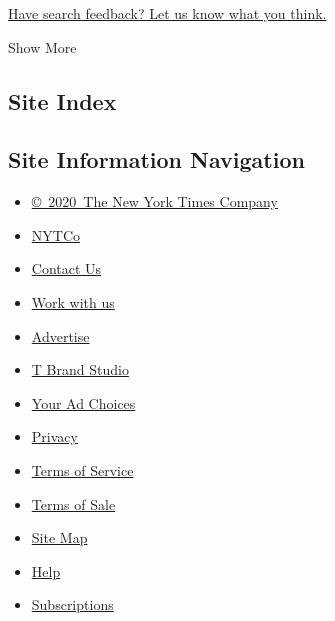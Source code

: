 \href{http://nyt.qualtrics.com/jfe/form/SV_ehZpyzWtbwO9HVj?v=a}{Have
search feedback? Let us know what you think.}

Show More

\hypertarget{site-index}{%
\subsection{Site Index}\label{site-index}}

\hypertarget{site-information-navigation}{%
\subsection{Site Information
Navigation}\label{site-information-navigation}}

\begin{itemize}
\tightlist
\item
  \href{https://help.nytimes3xbfgragh.onion/hc/en-us/articles/115014792127-Copyright-notice}{©~2020~The
  New York Times Company}
\end{itemize}

\begin{itemize}
\tightlist
\item
  \href{https://www.nytco.com/}{NYTCo}
\item
  \href{https://help.nytimes3xbfgragh.onion/hc/en-us/articles/115015385887-Contact-Us}{Contact
  Us}
\item
  \href{https://www.nytco.com/careers/}{Work with us}
\item
  \href{https://nytmediakit.com/}{Advertise}
\item
  \href{http://www.tbrandstudio.com/}{T Brand Studio}
\item
  \href{https://www.nytimes3xbfgragh.onion/privacy/cookie-policy\#how-do-i-manage-trackers}{Your
  Ad Choices}
\item
  \href{https://www.nytimes3xbfgragh.onion/privacy}{Privacy}
\item
  \href{https://help.nytimes3xbfgragh.onion/hc/en-us/articles/115014893428-Terms-of-service}{Terms
  of Service}
\item
  \href{https://help.nytimes3xbfgragh.onion/hc/en-us/articles/115014893968-Terms-of-sale}{Terms
  of Sale}
\item
  \href{https://spiderbites.nytimes3xbfgragh.onion}{Site Map}
\item
  \href{https://help.nytimes3xbfgragh.onion/hc/en-us}{Help}
\item
  \href{https://www.nytimes3xbfgragh.onion/subscription?campaignId=37WXW}{Subscriptions}
\end{itemize}
